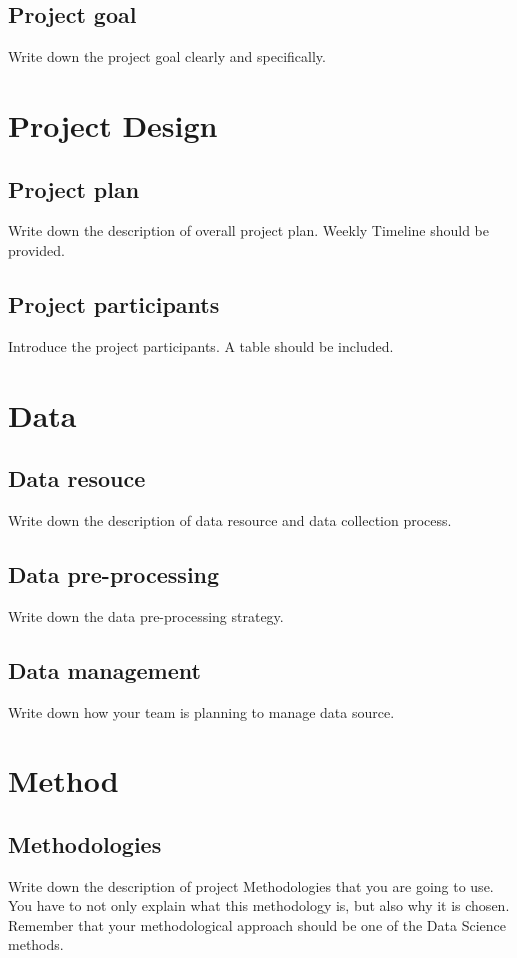 \documentclass[11pt]{article}
\begin{document}
    \subsection{Project goal}
    Write down the project goal clearly and specifically.

    \section{Project Design}
    \subsection{Project plan}                       
    Write down the description of overall project 
    plan. Weekly Timeline should be provided.

    \subsection{Project participants}                       
    Introduce the project participants. A table should be 
    included.    

       

    \section{Data}
    \subsection{Data resouce}
    Write down the description of data resource and 
    data collection process. 

    \subsection{Data pre-processing}
    Write down the data pre-processing strategy.

    \subsection{Data management}
    Write down how your team is planning to manage data
    source.

    \section{Method}                       
    \subsection{Methodologies}                       
    Write down the description of project Methodologies
    that you are going to use. You have to not only 
    explain what this methodology is, but also why it is 
    chosen. Remember that your methodological approach
    should be one of the Data Science methods. 
\end{document}
